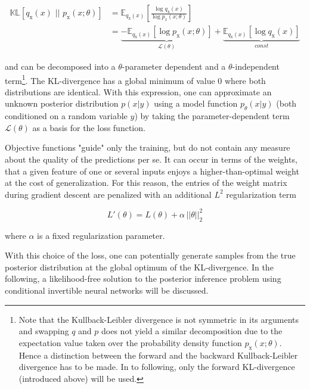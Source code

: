 \begin{equation}
	\begin{aligned}
		\mathbb{KL}\left[q_\text{x}(x) \, \, || \, \, p_\text{x}(x; \theta)\right] &= \mathbb{E}_{q_\text{x}(x)}\left[\frac{\log q_\text{x}(x)}{\log p_x(x; \theta)}\right] \\&= \underbrace{- \mathbb{E}_{q_\text{x}(x)} \left[ \log p_\text{x}(x; \theta)\right]}_{\mathcal{L}(\theta)} + \underbrace{\mathbb{E}_{q_\text{x}(x)}\left[\log q_\text{x}(x)\right]}_{const}
	\end{aligned}
	\label{eq:KL-loss}
\end{equation}

and can be decomposed into a $\theta$-parameter dependent and a $\theta$-independent term\footnote{Note that the Kullback-Leibler divergence is not symmetric in its arguments and swapping $q$ and $p$ does not yield a similar decomposition due to the expectation value taken over the probability density function $p_\text{x}(x; \theta)$. Hence a distinction between the forward and the backward Kullback-Leibler divergence has to be made. In to following, only the forward KL-divergence (introduced above) will be used.}. The KL-divergence has a global minimum of value 0 where both distributions are identical. With this expression, one can approximate an unknown posterior distribution $p(x | y)$ using a model function $p_\theta(x | y)$ (both conditioned on a random variable $y$) by taking the parameter-dependent term $\mathcal{L}(\theta)$ as a basis for the loss function.

Objective functions "guide" only the training, but do not contain any measure about the quality of the predictions per se. It can occur in terms of the weights, that a given feature of one or several inputs enjoys a higher-than-optimal weight at the cost of generalization. For this reason, the entries of the weight matrix during gradient descent are penalized with an additional $L^2$ regularization term

\begin{equation}
	L'(\theta) = L(\theta) + \alpha \, ||\theta|| _2^2
\end{equation}

where $\alpha$ is a fixed regularization parameter.

With this choice of the loss, one can potentially generate samples from the true posterior distribution at the global optimum of the KL-divergence. In the following, a likelihood-free solution to the posterior inference problem using conditional invertible neural networks will be discussed.

